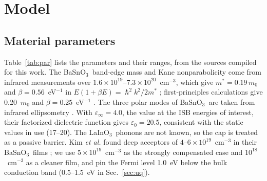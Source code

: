 \documentclass[11pt]{article}
\newcommand{\LIO}{LaInO$_3$}
\newcommand{\BSO}{BaSnO$_3$}
\begin{document}
\section{Model}\label{sec:model}
\subsection{Material parameters}
Table~\ref{tab:par} lists the parameters and their ranges, from the sources compiled for this work. The \BSO\ band-edge mass and Kane nonparabolicity come from infrared measurements over $1.6\times10^{19}$--$7.3\times10^{20}$~cm$^{-3}$, which give $m^*=0.19\,m_0$ and $\beta=0.56$~eV$^{-1}$ in $E(1+\beta E)=\hslash^2k^2/2m^*$ \cite{Niedermeier2017}; first-principles calculations give 0.20~$m_0$ and $\beta=0.25$~eV$^{-1}$ \cite{Krishnaswamy2017}. The three polar modes of \BSO\ are taken from infrared ellipsometry \cite{Stanislavchuk2012}. With $\varepsilon_\infty=4.0$, the value at the ISB energies of interest, their factorized dielectric function gives $\varepsilon_0=20.5$, consistent with the static values in use (17--20). The \LIO\ phonons are not known, so the cap is treated as a passive barrier. Kim \emph{et al.} found deep acceptors of $4$--$6\times10^{19}$~cm$^{-3}$ in their \BSO\ films \cite{Kim2019LIO}; we use $5\times10^{19}$~cm$^{-3}$ as the strongly compensated case and $10^{18}$~cm$^{-3}$ as a cleaner film, and pin the Fermi level 1.0~eV below the bulk conduction band (0.5--1.5~eV in Sec.~\ref{sec:uq}).
\end{document}
